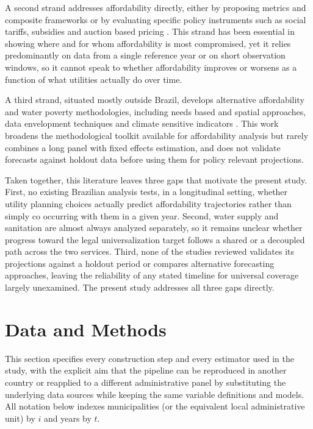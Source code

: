 \documentclass[pdflatex,sn-mathphys-num]{sn-jnl}%
\theoremstyle{thmstyleone}%
\theoremstyle{thmstyletwo}%
\theoremstyle{thmstylethree}%
\begin{document}
A second strand addresses affordability directly, either by proposing metrics and composite frameworks or by evaluating specific policy instruments such as social tariffs, subsidies and auction based pricing \citep{Fagundes2025a,Fagundes2025b,Fagundes2024,Amorim2025,Fraga2025,Torio2025,Wichman2025,Patterson2023,Skerker2024,Moreira2025,Correa2026,Lopes2024,Mendes2026,LimaeSilva2026}. This strand has been essential in showing where and for whom affordability is most compromised, yet it relies predominantly on data from a single reference year or on short observation windows, so it cannot speak to whether affordability improves or worsens as a function of what utilities actually do over time.

A third strand, situated mostly outside Brazil, develops alternative affordability and water poverty methodologies, including needs based and spatial approaches, data envelopment techniques and climate sensitive indicators \citep{MocholiArce2024,RomeroGomez2024,Nongbri2025,Wanguba2024,Belhadj2026}. This work broadens the methodological toolkit available for affordability analysis but rarely combines a long panel with fixed effects estimation, and does not validate forecasts against holdout data before using them for policy relevant projections.

Taken together, this literature leaves three gaps that motivate the present study. First, no existing Brazilian analysis tests, in a longitudinal setting, whether utility planning choices actually predict affordability trajectories rather than simply co occurring with them in a given year. Second, water supply and sanitation are almost always analyzed separately, so it remains unclear whether progress toward the legal universalization target follows a shared or a decoupled path across the two services. Third, none of the studies reviewed validates its projections against a holdout period or compares alternative forecasting approaches, leaving the reliability of any stated timeline for universal coverage largely unexamined. The present study addresses all three gaps directly.

\section{Data and Methods}\label{sec_methods}

This section specifies every construction step and every estimator used in the study, with the explicit aim that the pipeline can be reproduced in another country or reapplied to a different administrative panel by substituting the underlying data sources while keeping the same variable definitions and models. All notation below indexes municipalities (or the equivalent local administrative unit) by $i$ and years by $t$.
\end{document}

